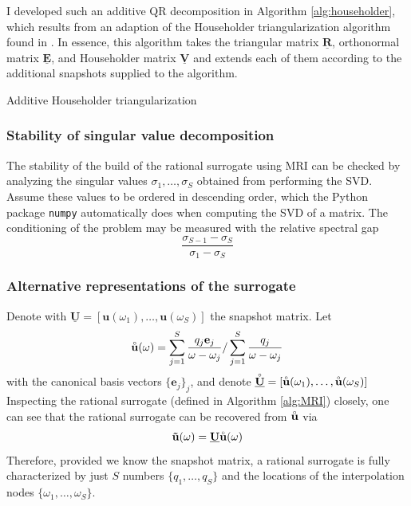 \documentclass[11pt, a4paper]{article}
\begin{document}
I developed such an additive QR decomposition in Algorithm \ref{alg:householder},
which results from an adaption of the Householder triangularization algorithm
found in \citep{householder}. In essence, this algorithm takes the triangular
matrix $\mathbf{\underline{R}}$, orthonormal matrix $\mathbf{\underline{E}}$,
and Householder matrix $\mathbf{\underline{V}}$ and extends each of them according
to the additional snapshots supplied to the algorithm.

\begin{algorithm}
    \caption{Additive Householder triangularization} \label{alg:householder}
    
\end{algorithm}


\subsubsection{Stability of singular value decomposition}
\label{subsubsec:svd}
The stability of the build of the rational surrogate using \acrshort{MRI}
can be checked by analyzing the singular values $\sigma_1, \dots, \sigma_S$ 
obtained from performing the \acrshort{SVD}. Assume these values to be
ordered in descending order, which the Python package
\texttt{numpy} automatically does when computing the \acrshort{SVD} of a matrix. 
The conditioning of the problem may be measured with the relative
spectral gap \cite{davidePHD}
\begin{equation}
    \frac{\sigma_{S-1} - \sigma_S}{\sigma_1 - \sigma_S} \label{equ:spectral-gap}
\end{equation}

\subsubsection{Alternative representations of the surrogate}
\label{subsubsec:u-ring}
Denote with $\mathbf{\underline{U}} = [\mathbf{u}(\omega_1), \dots, \mathbf{u}(\omega_S)]$
the snapshot matrix. Let 
\begin{equation}
    \accentset{\circ}{\mathbf{u}}(\omega) = \sum_{j=1}^S \frac{q_j \mathbf{e}_j}{\omega - \omega_j}
    / \sum_{j=1}^S \frac{q_j}{\omega - \omega_j} \label{equ:u-ring}
\end{equation}
with the canonical basis vectors $\{ \mathbf{e}_j \}_j$, and denote
$\accentset{\circ}{\mathbf{\underline{U}}} = [\accentset{\circ}{\mathbf{u}}(\omega_1), \dots, \accentset{\circ}{\mathbf{u}}(\omega_S)]$
Inspecting the rational surrogate (defined in Algorithm \ref{alg:MRI}) closely,
one can see that the rational surrogate can be recovered from $\accentset{\circ}{\mathbf{u}}$
via
\begin{equation}
    \mathbf{\tilde{u}}(\omega) = \mathbf{\underline{U}} \accentset{\circ}{\mathbf{u}}(\omega)
\end{equation}
Therefore, provided we know the snapshot matrix, a rational surrogate is
fully characterized by just $S$ numbers $\{q_1, \dots, q_S\}$
and the locations of the interpolation nodes $\{\omega_1, \dots, \omega_S\}$.
\end{document}
